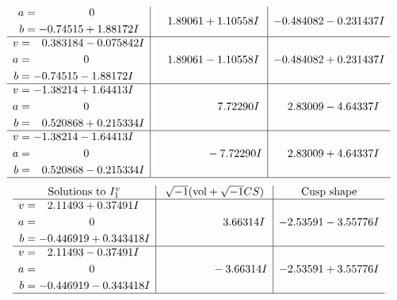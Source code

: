 \documentclass[1p]{elsarticle_modified}
\theoremstyle{definition}
\newcommand{\I}{\sqrt{-1}}
\begin{document}
$$\begin{array}{c|c|c}
\begin{aligned}
a &= \phantom{-0.000000 } 0 \\
b &= -0.74515 + 1.88172 I\end{aligned}
 & \phantom{-}1.89061 + 1.10558 I & -0.484082 - 0.231437 I \\ \hline\begin{aligned}
v &= \phantom{-}0.383184 - 0.075842 I \\
a &= \phantom{-0.000000 } 0 \\
b &= -0.74515 - 1.88172 I\end{aligned}
 & \phantom{-}1.89061 - 1.10558 I & -0.484082 + 0.231437 I \\ \hline\begin{aligned}
v &= -1.38214 + 1.64413 I \\
a &= \phantom{-0.000000 } 0 \\
b &= \phantom{-}0.520868 + 0.215334 I\end{aligned}
 & \phantom{-0.000000 -}7.72290 I & \phantom{-}2.83009 - 4.64337 I \\ \hline\begin{aligned}
v &= -1.38214 - 1.64413 I \\
a &= \phantom{-0.000000 } 0 \\
b &= \phantom{-}0.520868 - 0.215334 I\end{aligned}
 & \phantom{-0.000000 } -7.72290 I & \phantom{-}2.83009 + 4.64337 I\\
 \hline 
 \end{array}$$\newpage$$\begin{array}{c|c|c}  
\text{Solutions to }I^v_{1}& \I (\text{vol} + \sqrt{-1}CS) & \text{Cusp shape}\\
 \hline 
\begin{aligned}
v &= \phantom{-}2.11493 + 0.37491 I \\
a &= \phantom{-0.000000 } 0 \\
b &= -0.446919 + 0.343418 I\end{aligned}
 & \phantom{-0.000000 -}3.66314 I & -2.53591 - 3.55776 I \\ \hline\begin{aligned}
v &= \phantom{-}2.11493 - 0.37491 I \\
a &= \phantom{-0.000000 } 0 \\
b &= -0.446919 - 0.343418 I\end{aligned}
 & \phantom{-0.000000 } -3.66314 I & -2.53591 + 3.55776 I\\
 \hline 
 \end{array}$$\newpage
\newpage\renewcommand{\arraystretch}{1}
\end{document}
